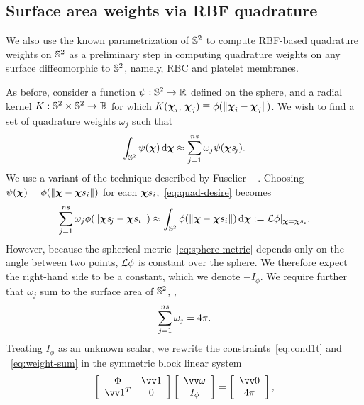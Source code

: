 \subsection{Surface area weights via RBF quadrature}\label{sec:rbf-quadrature}

We also use the known parametrization of $\mathbb{S}^2$ to compute RBF-based quadrature weights
on $\mathbb{S}^2$ as a preliminary step in computing quadrature weights on any surface
diffeomorphic to $\mathbb{S}^2$, namely, RBC and platelet membranes.

As before, consider a function $\psi:\mathbb{S}^2\to\mathbb{R}$ defined on the sphere, and a radial
kernel $K:\mathbb{S}^2\times\mathbb{S}^2\to\mathbb{R}$ for which
$K(\boldsymbol{\chi}_i,\,\boldsymbol{\chi}_j)\equiv\phi(\|\boldsymbol{\chi}_i-\boldsymbol{\chi}_j\|)$. We wish to find a set of quadrature
weights $\omega_j$ such that
\begin{equation}\label{eq:quad-desire}
    \int_{\sphere} \psi(\Xp) \d\Xp \approx \sum_{j=1}^{\sample\cardinality} \omega_j \psi(\Xpsj).
\end{equation}
We use a variant of the technique described by Fuselier ~%
\cite{Fuselier:2013coba}.  Choosing $\psi(\Xp) = \phi(\|\Xp-\sample\Xp_i\|)$ for each
$\sample\Xp_i$,~\eqref{eq:quad-desire} becomes
\begin{equation}
    \sum_{j=1}^{\sample\cardinality} \omega_j \phi(\|\Xpsj-\sample\Xp_i\|)
    \approx \int_{\sphere}\phi(\|\Xp-\sample\Xp_i\|) \d\Xp := \L\phi|_{\Xp=\sample\Xp_i}.
    \label{eq:cond1t}
\end{equation}
However, because the spherical metric~\eqref{eq:sphere-metric} depends only on the angle
between two points, $\mathcal{L}\phi$ is constant over the sphere. We therefore expect the
right-hand side to be a constant, which we denote $-I_\phi$. We require further that
$\omega_j$ sum to the surface area of $\mathbb{S}^2$, ,
\begin{equation}
    \sum_{j=1}^{\sample\cardinality} \omega_j  = 4\pi.
    \label{eq:weight-sum}
\end{equation}
Treating $I_\phi$ as an unknown scalar, we rewrite the constraints~\eqref{eq:cond1t} and%
~\eqref{eq:weight-sum} in the symmetric block linear system %
\begin{equation}\label{eq:rbf-quadrature}
    \left[\begin{array}{cc}
            \Phi & \arr{1} \\ \arr{1}^T & 0
    \end{array}\right]\left[\begin{array}{cc}
            \arr{\omega} \\ I_\phi
    \end{array}\right] = \left[\begin{array}{c}
            \arr{0} \\ 4\pi
    \end{array}\right],
\end{equation}
